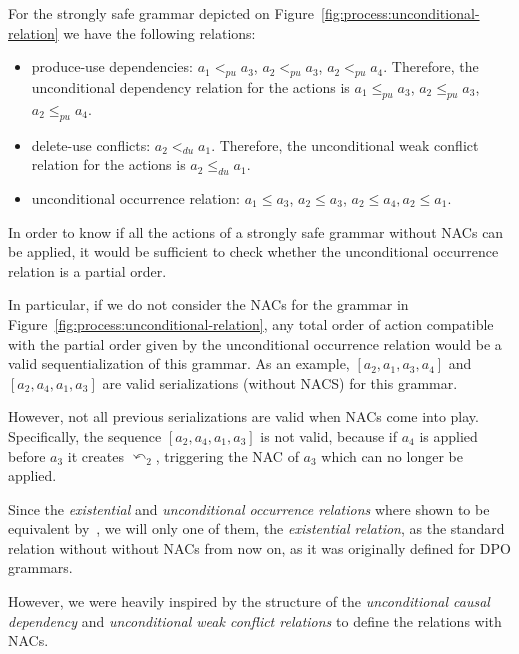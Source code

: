 \begin{example}  For the strongly safe grammar depicted on Figure~\ref{fig:process:unconditional-relation} we have the following relations: 

\begin{itemize}
  \item produce-use dependencies: $a_1 <_{pu} a_3$, $a_2 <_{pu} a_3$, $a_2 <_{pu} a_4$. Therefore, the unconditional dependency relation for the actions is $a_1 \leq_{pu} a_3$, $a_2 \leq_{pu} a_3$, $a_2 \leq_{pu} a_4$. 
  \item delete-use conflicts: $a_2 <_{du} a_1$. Therefore, the unconditional weak conflict relation for the actions is $a_2 \leq_{du} a_1$.
  \item unconditional occurrence relation: $a_1 \leq a_3$, $a_2 \leq a_3$, $a_2 \leq a_4, a_2 \leq a_1$.
\end{itemize}

  In order to know if all the actions of a strongly safe grammar without NACs can be applied, it would be sufficient to check whether the unconditional occurrence relation is a partial order.

  In particular, if we do not consider the NACs for the grammar in Figure~\ref{fig:process:unconditional-relation}, any total order of action compatible with the partial order given by the unconditional occurrence relation would be a valid sequentialization of this grammar. As an example, $[a_2, a_1, a_3, a_4]$ and $[a_2, a_4, a_1, a_3]$ are valid serializations (without NACS) for this grammar. 
  
  However, not all previous serializations are valid when NACs come into play. Specifically, the sequence $[a_2, a_4, a_1, a_3]$ is not valid, because if $a_4$ is applied before $a_3$ it creates $\curvearrowleft_2$, triggering the NAC of $a_3$ which can no longer be applied.

\end{example}

\begin{remark} Since the \emph{existential} and \emph{unconditional occurrence relations} where shown to be equivalent by~\cite{Ribeiro1996}, we will only one of them, the \emph{existential relation}, as the standard relation without without NACs from now on, as it was originally defined for DPO grammars.

  However, we were heavily inspired by the structure of the \emph{unconditional causal dependency} and \emph{unconditional weak conflict relations} to define the relations with NACs.
\end{remark}

